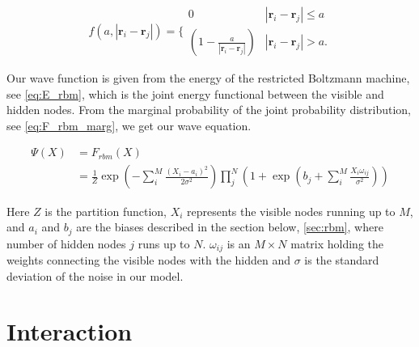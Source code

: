 \begin{equation} \label{eq:jastrow_f}
    f(a,|\mathbf{r}_i-\mathbf{r}_j|)=\Bigg\{
 \begin{array}{ll}
	 0 & {|\mathbf{r}_i-\mathbf{r}_j|} \leq {a}\\
	 (1-\frac{a}{|\mathbf{r}_i-\mathbf{r}_j|}) & {|\mathbf{r}_i-\mathbf{r}_j|} > {a}.
 \end{array}
\end{equation}

Our wave function is given from the energy of the restricted Boltzmann machine, see \eqref{eq:E_rbm}, which is the joint energy functional between the visible and hidden nodes. From the marginal probability of the joint probability distribution, see \eqref{eq:F_rbm_marg}, we get our wave equation.                     

\begin{align}\label{eq:F_rbm}
\Psi(X) &= F_{rbm}(X) \\
&= \frac{1}{Z} \exp \left( -\sum_{i}^{M} \frac{(X_i - a_i)^2}{2 \sigma^2} \right) \prod_{j}^{N} \left( 1 + \exp \left( b_j + \sum_{i}^{M} \frac{X_i \omega_{ij}}{\sigma^2} \right) \right)
\end{align}

Here $Z$ is the partition function, $X_i$ represents the visible nodes running up to $M$, and $a_i$ and $b_j$ are the biases described in the section below, \eqref{sec:rbm}, where number of hidden nodes $j$ runs up to $N$. 
$\omega_{ij}$ is an $M \times N$ matrix holding the weights connecting the visible nodes with the hidden and $\sigma$ is the standard deviation of the noise in our model. \\

\section{Interaction}